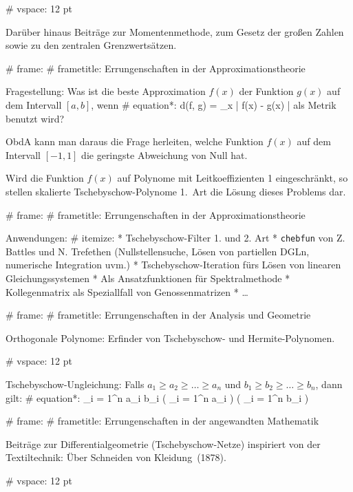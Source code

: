   # vspace: 12 pt

  Darüber hinaus Beiträge zur Momentenmethode, zum Gesetz der großen Zahlen
  sowie zu den zentralen Grenzwertsätzen.


# frame:
  # frametitle: Errungenschaften in der Approximationstheorie

  Fragestellung:
  Was ist die beste Approximation $f(x)$ der Funktion $g(x)$ auf dem Intervall $[a, b]$, wenn
  # equation*:
    d(f, g) = \max_{x \in [a, b]} | f(x) - g(x) |
  als Metrik benutzt wird?

  ObdA kann man daraus die Frage herleiten,
  welche Funktion $f(x)$ auf dem Intervall $[-1, 1]$ die geringste Abweichung von Null hat.

  Wird die Funktion $f(x)$ auf Polynome mit Leitkoeffizienten 1 eingeschränkt,
  so stellen skalierte Tschebyschow-Polynome 1.~Art die Lösung dieses Problems dar.


# frame:
  # frametitle: Errungenschaften in der Approximationstheorie

  Anwendungen:
  # itemize:
    * Tschebyschow-Filter 1. und 2. Art
    * \texttt{chebfun} von Z. Battles und N. Trefethen
      (Nullstellensuche, Lösen von partiellen DGLn, numerische Integration uvm.)
    * Tschebyschow-Iteration fürs Lösen von linearen Gleichungssystemen
    * Als Ansatzfunktionen für Spektralmethode
    * Kollegenmatrix als Speziallfall von Genossenmatrizen
    * \ldots


# frame:
  # frametitle: Errungenschaften in der Analysis und Geometrie

  Orthogonale Polynome: Erfinder von Tschebyschow- und Hermite-Polynomen.

  # vspace: 12 pt

  Tschebyschow-Ungleichung:
  Falls $a_1 \geqslant a_2 \geqslant \ldots \geqslant a_n$ und
  $b_1 \geqslant b_2 \geqslant \ldots \geqslant b_n$, dann gilt:
  # equation*:
     \sum_{i = 1}^n a_i b_i
    \geqslant
    \left(  \sum_{i = 1}^n a_i \right)
    \left(  \sum_{i = 1}^n b_i \right)

# frame:
  # frametitle: Errungenschaften in der angewandten Mathematik

  Beiträge zur Differentialgeometrie (Tschebyschow-Netze) inspiriert von der Textiltechnik:
  \glqq Über Schneiden von Kleidung\grqq\ (1878).

  # vspace: 12 pt

